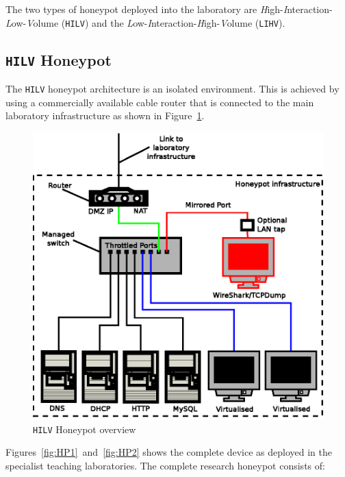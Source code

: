 The two types of honeypot deployed into the laboratory are \emph{H}igh-\emph{I}nteraction-\emph{L}ow-\emph{V}olume (\texttt{HILV}) and the \emph{L}ow-\emph{I}nteraction-\emph{H}igh-\emph{V}olume (\texttt{LIHV}).

\subsection{\texttt{HILV} Honeypot}
The \texttt{HILV} honeypot architecture is an isolated environment. This is achieved by using a commercially available cable router that is connected to the main laboratory infrastructure as shown in Figure~\ref{fig:HPOverview}. 

\begin{figure}[!ht]
\begin{center}
	\includegraphics[scale=0.70]{Images/Honeypot1.eps}
\caption{\texttt{HILV} Honeypot overview}
\label{fig:HPOverview}
\end{center}
\end{figure}

Figures~\ref{fig:HP1}~and~\ref{fig:HP2} shows the complete device as deployed in the specialist teaching laboratories. The complete research honeypot consists of:

